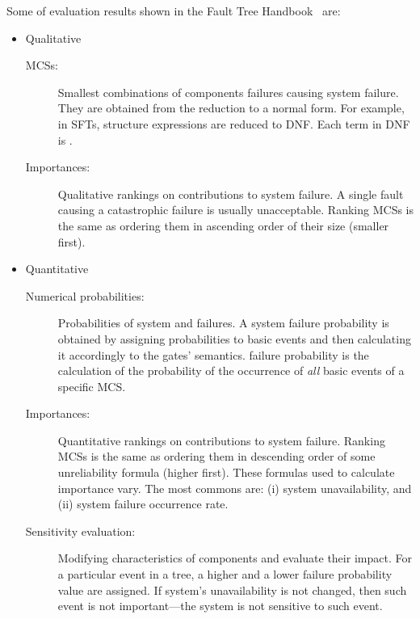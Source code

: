 \documentclass[en,twoside,onehalfspacing,phd]{risethesis}
\def\FThandbook{Fault Tree Handbook~\cite{VGR+1981}\index{Fault Tree!Handbook}%
  \gdef\FThandbook{Fault Tree Handbook\index{Fault Tree!Handbook}\xspace}%
  \xspace}
\begin{document}
Some of  evaluation results shown in the \FThandbook are:
%
\begin{itemize}
  \item Qualitative
  \begin{description}
    \item[\Acp{MCS}:]
    Smallest combinations of components failures causing system failure.
    They are obtained from the reduction to a normal form.
    For example, in \acp{SFT}, structure expressions are reduced to \ac{DNF}.
    Each term in \ac{DNF} is .
    \item[Importances:]
    Qualitative rankings on contributions to system failure.
    A single fault causing a catastrophic failure is usually unacceptable.
    Ranking \acp{MCS} is the same as ordering them in ascending order of their size (smaller first).
  \end{description}
  \item Quantitative
  \begin{description}
    \item[Numerical probabilities:]
    Probabilities of system and  failures.
    A system failure probability is obtained by assigning probabilities to basic events and then calculating it accordingly to the gates' semantics.
     failure probability is the calculation of the probability of the occurrence of \emph{all} basic events of a specific \ac{MCS}.
    \item[Importances:]
    Quantitative rankings on contributions to system failure.
    Ranking \acp{MCS} is the same as ordering them in descending order of some unreliability formula (higher first).
    These formulas used to calculate importance vary.
    The most commons are: (i) system unavailability, and (ii) system failure occurrence rate.
    \item[Sensitivity evaluation:]
    Modifying characteristics of components and evaluate their impact.
    For a particular event in a tree, a higher and a lower failure probability value are assigned.
    If system's unavailability is not changed, then such event is not important---the system is not sensitive to such event.
  \end{description}
\end{itemize}
\end{document}
